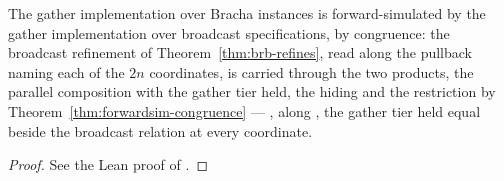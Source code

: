 \begin{theorem}
  \label{thm:gather-low-refines}
  \leanok
  The gather implementation over Bracha instances is forward-simulated by the gather implementation over broadcast specifications, by congruence: the broadcast refinement of Theorem~\ref{thm:brb-refines}, read along the pullback naming each of the $2n$ coordinates, is carried through the two products, the parallel composition with the gather tier held, the hiding and the restriction by Theorem~\ref{thm:forwardsim-congruence} --- , along , the gather tier held equal beside the broadcast relation at every coordinate.
\end{theorem}

\begin{proof}\leanok
  See the Lean proof of .
\end{proof}
